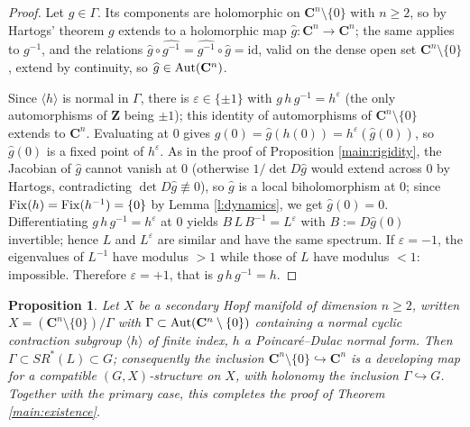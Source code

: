 \documentclass[english,11pt]{amsart}
\newtheorem{proposition}[theorem]{Proposition}
\theoremstyle{definition}
\theoremstyle{remark}
\numberwithin{equation}{section}
\newcommand{\eps}{\varepsilon}
\newcommand{\Z}{\mathbf{Z}}
\newcommand{\C}{\mathbf{C}}
\newcommand{\Aut}{\mathop{\rm Aut}}
\newcommand{\Fix}{\mathop{\rm Fix}}
\begin{document}
\begin{proof}
Let $g\in\Gamma$. Its components are holomorphic on $\C^n\setminus\{0\}$ with $n\geq2$, so by Hartogs' theorem $g$ extends to a holomorphic map $\widehat g:\C^n\to\C^n$; the same applies to $g^{-1}$, and the relations $\widehat g\circ\widehat{g^{-1}}=\widehat{g^{-1}}\circ\widehat g=\mathrm{id}$, valid on the dense open set $\C^n\setminus\{0\}$, extend by continuity, so $\widehat g\in\Aut(\C^n)$.

Since $\langle h\rangle$ is normal in $\Gamma$, there is $\eps\in\{\pm1\}$ with $g\, h\, g^{-1}=h^{\eps}$ (the only automorphisms of $\Z$ being $\pm1$); this identity of automorphisms of $\C^n\setminus\{0\}$ extends to $\C^n$. Evaluating at $0$ gives $\widehat g(0)=\widehat g(h(0))=h^{\eps}(\widehat g(0))$, so $\widehat g(0)$ is a fixed point of $h^{\eps}$. As in the proof of Proposition \ref{main:rigidity}, the Jacobian of $\widehat g$ cannot vanish at $0$ (otherwise $1/\det D\widehat g$ would extend across $0$ by Hartogs, contradicting $\det D\widehat g\not\equiv0$), so $\widehat g$ is a local biholomorphism at $0$; since $\Fix(h)=\Fix(h^{-1})=\{0\}$ by Lemma \ref{l:dynamics}, we get $\widehat g(0)=0$. Differentiating $g\, h\, g^{-1}=h^{\eps}$ at $0$ yields $B\,L\,B^{-1}=L^{\eps}$ with $B:=D\widehat g(0)$ invertible; hence $L$ and $L^{\eps}$ are similar and have the same spectrum. If $\eps=-1$, the eigenvalues of $L^{-1}$ have modulus $>1$ while those of $L$ have modulus $<1$: impossible. Therefore $\eps=+1$, that is $g\,h\,g^{-1}=h$.
\end{proof}

\begin{proposition}\label{main:secondary}
Let $X$ be a secondary Hopf manifold of dimension $n\geq 2$, written $X=(\C^n\setminus\{0\})/\Gamma$ with $\Gamma\subset\Aut(\C^n\setminus\{0\})$ containing a normal cyclic contraction subgroup $\langle h\rangle$ of finite index, $h$ a Poincar\'e--Dulac normal form. Then $\Gamma\subset SR^*(L)\subset G$; consequently the inclusion $\C^n\setminus\{0\}\hookrightarrow\C^n$ is a developing map for a compatible $(G,X)$-structure on $X$, with holonomy the inclusion $\Gamma\hookrightarrow G$. Together with the primary case, this completes the proof of Theorem \ref{main:existence}.
\end{proposition}
\end{document}
